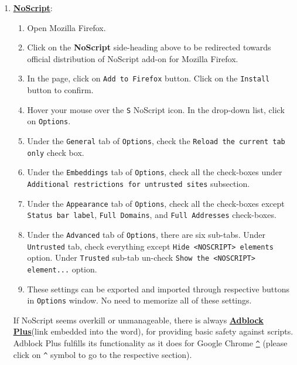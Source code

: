 \documentclass[12pt]{extarticle}
\begin{document}
	
	\noindent
	\begin{enumerate}
	
	\item	\href{https://addons.mozilla.org/en-US/firefox/addon/noscript/}{\textbf{\underline{NoScript}}}:\\
	
	\begin{enumerate}
		\item Open Mozilla Firefox.
		\item Click on the \textbf{NoScript} side-heading above to be redirected towards official distribution of NoScript add-on for Mozilla Firefox.
		\item In the page, click on \texttt{Add to Firefox} button. Click on the \texttt{Install} button to confirm.
		\item Hover your mouse over the \texttt{S} NoScript icon. In the drop-down list, click on \texttt{Options}.
		\item Under the \texttt{General} tab of \texttt{Options}, check the \texttt{Reload the current tab only} check box.  
		\item Under the \texttt{Embeddings} tab of \texttt{Options}, check all the check-boxes under \texttt{Additional restrictions for untrusted sites} subsection.
		\item Under the \texttt{Appearance} tab of \texttt{Options}, check all the check-boxes except \texttt{Status bar label}, \texttt{Full Domains}, and \texttt{Full Addresses} check-boxes.
		\item Under the \texttt{Advanced} tab of \texttt{Options}, there are six sub-tabs. Under \texttt{Untrusted} tab, check everything except \texttt{Hide <NOSCRIPT> elements} option. Under \texttt{Trusted} sub-tab un-check \texttt{Show the <NOSCRIPT> element...} option. 
		\item These settings can be exported and imported through respective buttons in \texttt{Options} window. No need to memorize all of these settings.	
	\end{enumerate}
	
	\noindent
	If NoScript seems overkill or unmanageable, there is always \href{https://addons.mozilla.org/en-US/firefox/addon/adblock-plus/}{\textbf{\underline{Adblock Plus}}}(link embedded into the word), for providing basic safety against scripts. Adblock Plus fulfills its functionality as it does for Google Chrome {\hyperref[slide 8]{\texttt{\^}}} (please click on \texttt{\^} symbol to go to the respective section). 
	

\end{enumerate}
\end{document}
